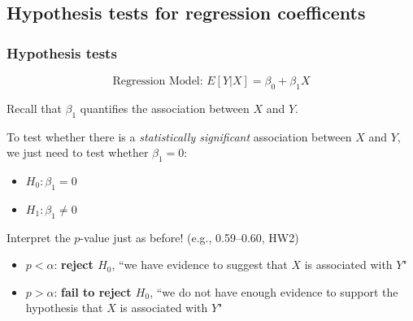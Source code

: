 \documentclass[12pt, 
hyperref={colorlinks=true, linkcolor=blue, urlcolor=cyan}]{beamer}
\begin{document}
\subsection{Hypothesis tests for regression coefficents}
\begin{frame}
\frametitle{Hypothesis tests}

$$\text{Regression Model: } E[Y|X] = \beta_0 + \beta_1 X$$

Recall that $\beta_1$ quantifies the association between $X$ and $Y$.

To test whether there is a \textit{statistically significant} association between $X$ and $Y$, \color{blue} we just need to test whether $\beta_1 = 0$: \vspace{-0.3cm} \color{black}
\begin{itemize}
\item $H_0: \beta_1 = 0$
\item $H_1: \beta_1 \not= 0$
\end{itemize}

\pause
Interpret the $p$-value just as before! (e.g., 0.59--0.60, HW2) \vspace{-0.4cm}
\begin{small}
\begin{itemize} \itemsep -2pt
\item $p < \alpha$: \textbf{reject $H_0$}, ``we have evidence to suggest that $X$ is associated with $Y$"
\item $p > \alpha$: \textbf{fail to reject $H_0$}, ``we do not have enough evidence to support the hypothesis that $X$ is associated with $Y$"
\end{itemize}
\end{small}
\end{frame}

\end{document}
